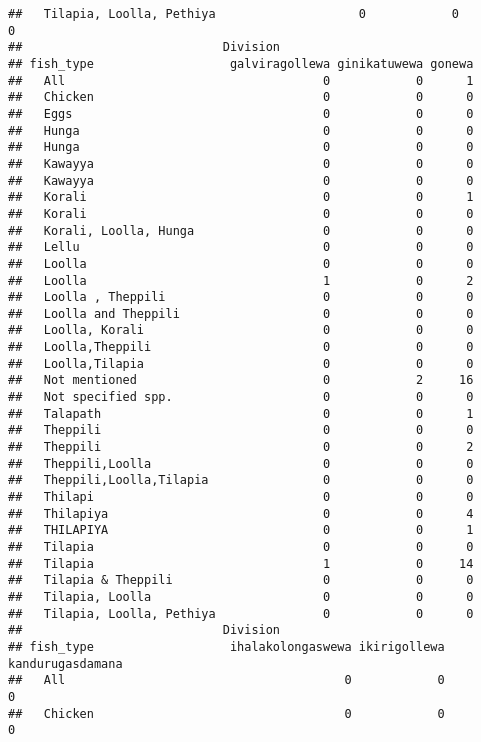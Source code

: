 \documentclass[
]{article}
\begin{document}
\begin{verbatim}
##   Tilapia, Loolla, Pethiya                    0            0            0
##                            Division
## fish_type                   galviragollewa ginikatuwewa gonewa
##   All                                    0            0      1
##   Chicken                                0            0      0
##   Eggs                                   0            0      0
##   Hunga                                  0            0      0
##   Hunga                                  0            0      0
##   Kawayya                                0            0      0
##   Kawayya                                0            0      0
##   Korali                                 0            0      1
##   Korali                                 0            0      0
##   Korali, Loolla, Hunga                  0            0      0
##   Lellu                                  0            0      0
##   Loolla                                 0            0      0
##   Loolla                                 1            0      2
##   Loolla , Theppili                      0            0      0
##   Loolla and Theppili                    0            0      0
##   Loolla, Korali                         0            0      0
##   Loolla,Theppili                        0            0      0
##   Loolla,Tilapia                         0            0      0
##   Not mentioned                          0            2     16
##   Not specified spp.                     0            0      0
##   Talapath                               0            0      1
##   Theppili                               0            0      0
##   Theppili                               0            0      2
##   Theppili,Loolla                        0            0      0
##   Theppili,Loolla,Tilapia                0            0      0
##   Thilapi                                0            0      0
##   Thilapiya                              0            0      4
##   THILAPIYA                              0            0      1
##   Tilapia                                0            0      0
##   Tilapia                                1            0     14
##   Tilapia & Theppili                     0            0      0
##   Tilapia, Loolla                        0            0      0
##   Tilapia, Loolla, Pethiya               0            0      0
##                            Division
## fish_type                   ihalakolongaswewa ikirigollewa kandurugasdamana
##   All                                       0            0                0
##   Chicken                                   0            0                0

\end{verbatim}
\end{document}
